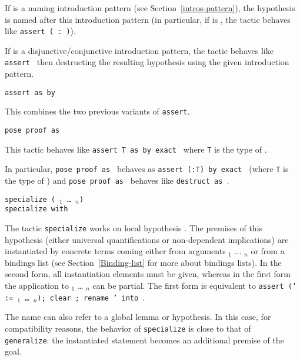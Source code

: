 \begin{coq_example*}
\begin{Variants}
  If {\intropattern} is a naming introduction pattern (see
  Section~\ref{intros-pattern}), the hypothesis is named after this
  introduction pattern (in particular, if {\intropattern} is {\ident},
  the tactic behaves like \texttt{assert ({\ident} :\ {\form})}).

  If {\intropattern} is a disjunctive/conjunctive introduction
  pattern, the tactic behaves like \texttt{assert {\form}} then destructing the
  resulting hypothesis using the given introduction pattern.

\item \texttt{assert {\form} as {\intropattern} by {\tac}}

  This combines the two previous variants of {\tt assert}.

\item \texttt{pose proof {\term} as {\intropattern}}

  This tactic behaves like \texttt{assert T as {\intropattern} by
  exact {\term}} where \texttt{T} is the type of {\term}.

  In particular, \texttt{pose proof {\term} as {\ident}} behaves as
  \texttt{assert ({\ident}:T) by exact {\term}} (where \texttt{T} is
  the type of {\term}) and \texttt{pose proof {\term} as
  {\disjconjintropattern}} behaves
  like \texttt{destruct {\term} as {\disjconjintropattern}}.

\item {\tt specialize ({\ident} \term$_1$ \dots\ \term$_n$)} \\
      {\tt specialize {\ident} with \bindinglist}

      The tactic {\tt specialize} works on local hypothesis \ident.
      The premises of this hypothesis (either universal
      quantifications or non-dependent implications) are instantiated
      by concrete terms coming either from arguments \term$_1$
      $\ldots$ \term$_n$ or from a bindings list (see
      Section~\ref{Binding-list} for more about bindings lists). In the
      second form, all instantiation elements must be given, whereas
      in the first form the application to \term$_1$ {\ldots}
      \term$_n$ can be partial. The first form is equivalent to
      {\tt assert (\ident' := {\ident} {\term$_1$} \dots\ \term$_n$);
           clear \ident; rename \ident' into \ident}.

      The name {\ident} can also refer to a global lemma or
      hypothesis. In this case, for compatibility reasons, the
      behavior of {\tt specialize} is close to that of {\tt
        generalize}: the instantiated statement becomes an additional
      premise of the goal.


\end{Variants}
\end{coq_example*}
